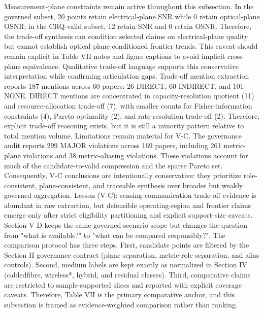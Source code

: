 {}Measurement-plane constraints remain active throughout this subsection. In the governed subset, 20 points retain electrical-plane SNR while 0 retain optical-plane OSNR; in the CRQ-valid subset, 12 retain SNR and 0 retain OSNR. Therefore, the trade-off synthesis can condition selected claims on electrical-plane quality but cannot establish optical-plane-conditioned frontier trends. This caveat should remain explicit in Table VII notes and figure captions to avoid implicit cross-plane equivalence.\markdownRendererParagraphSeparator
{}Qualitative trade-off language supports this conservative interpretation while confirming articulation gaps. Trade-off mention extraction reports 187 mentions across 60 papers: 26 DIRECT, 60 INDIRECT, and 101 NONE. DIRECT mentions are concentrated in capacity-resolution quotient (11) and resource-allocation trade-off (7), with smaller counts for Fisher-information constraints (4), Pareto optimality (2), and rate-resolution trade-off (2). Therefore, explicit trade-off reasoning exists, but it is still a minority pattern relative to total mention volume.\markdownRendererParagraphSeparator
{}Limitations remain material for V-C. The governance audit reports 299 MAJOR violations across 169 papers, including 261 metric-plane violations and 38 metric-aliasing violations. These violations account for much of the candidate-to-valid compression and the sparse Pareto set. Consequently, V-C conclusions are intentionally conservative: they prioritize role-consistent, plane-consistent, and traceable synthesis over broader but weakly governed aggregation.\markdownRendererParagraphSeparator
{}Lesson (V-C): sensing-communication trade-off evidence is abundant in raw extraction, but defensible operating-region and frontier claims emerge only after strict eligibility partitioning and explicit support-size caveats.\markdownRendererInterblockSeparator
{}
\markdownRendererSectionEnd \markdownRendererSectionBegin
{}\markdownRendererInterblockSeparator
{}Section V-D keeps the same governed scenario scope but changes the question from "what is available?" to "what can be compared responsibly?". The comparison protocol has three steps. First, candidate points are filtered by the Section II governance contract (plane separation, metric-role separation, and alias controls). Second, medium labels are kept exactly as normalized in Section IV (cabled\markdownRendererUnderscore{}fibre, wireless\markdownRendererUnderscore{}*, hybrid, and residual classes). Third, comparative claims are restricted to sample-supported slices and reported with explicit coverage caveats. Therefore, Table VII is the primary comparative anchor, and this subsection is framed as evidence-weighted comparison rather than ranking.\markdownRendererInterblockSeparator
